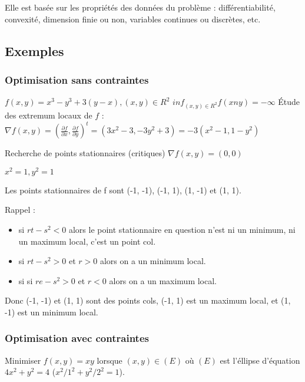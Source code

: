 	Elle est basée sur les propriétés des données du problème : différentiabilité, convexité, dimension finie ou non, variables continues ou discrètes, etc.
	
	
	\subsection{Exemples}
	
		\subsubsection{Optimisation sans contraintes}
		
	$f(x, y) = x^3 - y^3 + 3(y-x), (x, y) \in R^2$
	$inf_{(x, y) \in R^2} f(xn y) = -\infty$
	Étude des extremum locaux de $f$ :
	$\nabla f(x, y) = (\frac{\partial f}{\partial x}, \frac{\partial f}{\partial y})^t = (3x^2-3, -3y^2 +3)=-3(x^2-1 , 1-y^2)$
	
	Recherche de points stationnaires (critiques) $\nabla f(x, y) = ( 0, 0)$
	
	$ x^2 = 1 , y^2 = 1$
	
	Les points stationnaires de f sont (-1, -1), (-1, 1), (1, -1) et (1, 1).
	
	
	Rappel :
	\begin{itemize}
		\item si $rt-s^2 <0$ alors le point stationnaire en question n'est ni un minimum, ni un maximum local, c'est un point \og col\fg.
		\item si $rt -s^2 >0$ et $r>0$ alors on a un minimum local. 
		\item si si $re -s^2 >0$ et $r<0$ alors on a un maximum local.
	\end{itemize}
	
	Donc (-1, -1) et (1, 1) sont des points cols, (-1, 1) est un maximum local, et (1, -1) est un minimum local.
	
	
		\subsubsection{Optimisation avec contraintes}
		
		Minimiser $f(x, y) = xy$ lorsque $(x, y) \in (E)$ où $(E)$ est l'éllipse d'équation $4x^2+y^2=4$ ($x^2/1^2 + y^2/2^2 = 1$).
		
